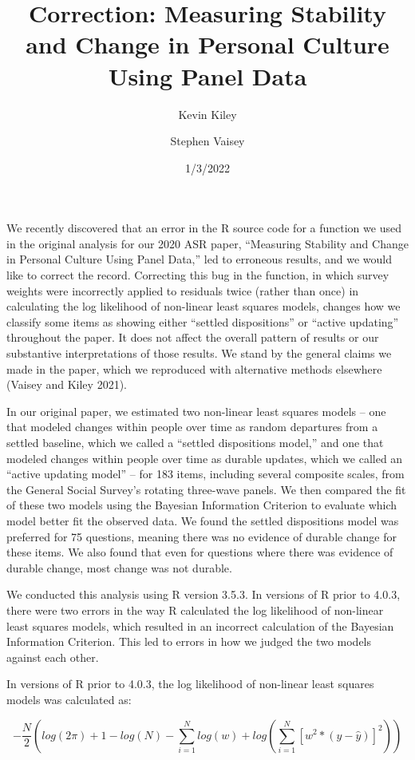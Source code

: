 \documentclass[
]{article}
\title{Correction: Measuring Stability and Change in Personal Culture
Using Panel Data}
\author{Kevin Kiley \and Stephen Vaisey}
\date{1/3/2022}
\begin{document}
\maketitle

We recently discovered that an error in the R source code for a function
we used in the original analysis for our 2020 ASR paper, ``Measuring
Stability and Change in Personal Culture Using Panel Data,'' led to
erroneous results, and we would like to correct the record. Correcting
this bug in the function, in which survey weights were incorrectly
applied to residuals twice (rather than once) in calculating the log
likelihood of non-linear least squares models, changes how we classify
some items as showing either ``settled dispositions'' or ``active
updating'' throughout the paper. It does not affect the overall pattern
of results or our substantive interpretations of those results. We stand
by the general claims we made in the paper, which we reproduced with
alternative methods elsewhere (Vaisey and Kiley 2021).

In our original paper, we estimated two non-linear least squares models
-- one that modeled changes within people over time as random departures
from a settled baseline, which we called a ``settled dispositions
model,'' and one that modeled changes within people over time as durable
updates, which we called an ``active updating model'' -- for 183 items,
including several composite scales, from the General Social Survey's
rotating three-wave panels. We then compared the fit of these two models
using the Bayesian Information Criterion to evaluate which model better
fit the observed data. We found the settled dispositions model was
preferred for 75 questions, meaning there was no evidence of durable
change for these items. We also found that even for questions where
there was evidence of durable change, most change was not durable.

We conducted this analysis using R version 3.5.3. In versions of R prior
to 4.0.3, there were two errors in the way R calculated the log
likelihood of non-linear least squares models, which resulted in an
incorrect calculation of the Bayesian Information Criterion. This led to
errors in how we judged the two models against each other.

In versions of R prior to 4.0.3, the log likelihood of non-linear least
squares models was calculated as:

\[ - \frac{N}{2}(log(2\pi) + 1 - log(N) - \sum_{i=1}^N{log(w) + log(\sum_{i=1}^N{[w^2*(y - \hat{y})]^2})}) \]
\end{document}

